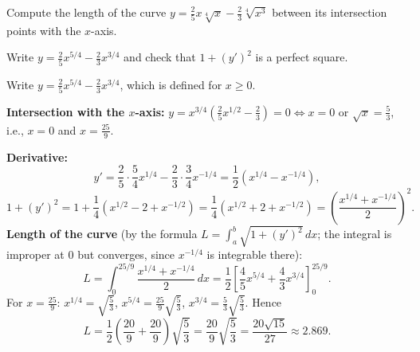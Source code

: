 
\begin{question}
Compute the length of the curve $y=\frac25x\sqrt[4]{x}-\frac23\sqrt[4]{x^3}$ between its intersection points with the $x$-axis.
\end{question}

\begin{hint}
Write $y=\frac25x^{5/4}-\frac23x^{3/4}$ and check that $1+(y')^2$ is a perfect square.
\end{hint}

\begin{solution}
Write $y=\frac25x^{5/4}-\frac23x^{3/4}$, which is defined for $x\ge0$.

\textbf{Intersection with the $x$-axis:} $y=x^{3/4}\left(\frac25x^{1/2}-\frac23\right)=0\iff x=0$ or $\sqrt{x}=\frac53$, i.e., $x=0$ and $x=\frac{25}{9}$.

\textbf{Derivative:}
\[
y'=\frac25\cdot\frac54x^{1/4}-\frac23\cdot\frac34x^{-1/4}=\frac12\left(x^{1/4}-x^{-1/4}\right),
\]
\[
1+(y')^2=1+\frac14\left(x^{1/2}-2+x^{-1/2}\right)=\frac14\left(x^{1/2}+2+x^{-1/2}\right)=\left(\frac{x^{1/4}+x^{-1/4}}{2}\right)^2.
\]
\textbf{Length of the curve} (by the formula $L=\int_a^b\sqrt{1+(y')^2}\,dx$; the integral is improper at $0$ but converges, since $x^{-1/4}$ is integrable there):
\[
L=\int_0^{25/9}\frac{x^{1/4}+x^{-1/4}}{2}\,dx=\frac12\left[\frac45x^{5/4}+\frac43x^{3/4}\right]_0^{25/9}.
\]
For $x=\frac{25}{9}$: $x^{1/4}=\sqrt{\frac53}$, $x^{5/4}=\frac{25}{9}\sqrt{\frac53}$, $x^{3/4}=\frac53\sqrt{\frac53}$. Hence
\[
L=\frac12\left(\frac{20}{9}+\frac{20}{9}\right)\sqrt{\frac53}=\frac{20}{9}\sqrt{\frac53}=\frac{20\sqrt{15}}{27}\approx2.869.
\]
\end{solution}
